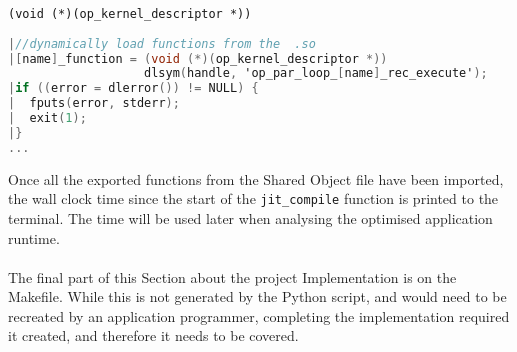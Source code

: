 \verb|(void (*)(op_kernel_descriptor *))|
\vspace{1em}
\begin{lstlisting}[backgroundcolor=\color{red!20}, language=C]
|//dynamically load functions from the  .so
|[name]_function = (void (*)(op_kernel_descriptor *))
                   dlsym(handle, 'op_par_loop_[name]_rec_execute');
|if ((error = dlerror()) != NULL) {
|  fputs(error, stderr);
|  exit(1);
|}
...
\end{lstlisting}
\par
\noindent Once all the exported functions from the Shared Object file have been imported, the wall clock time since the start of the \verb|jit_compile| function is printed to the terminal. The time will be used later when analysing the optimised application runtime.\\
\\
The final part of this Section about the project Implementation is on the Makefile. While this is not generated by the Python script, and would need to be recreated by an application programmer, completing the implementation required it created, and therefore it needs to be covered.
\clearpage
